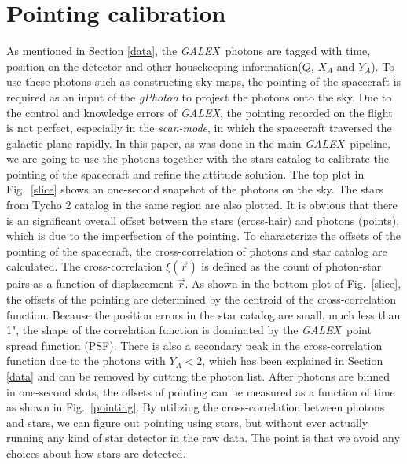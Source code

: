 \documentclass[12pt, preprint]{aastex61}
\newcommand{\project}[1]{\textsl{#1}}
\newcommand{\galex}{\project{GALEX}}
\newcommand{\scanmode}{\project{scan-mode}}
\begin{document}
\section{Pointing calibration}
\label{pc}
As mentioned in Section \ref{data}, the \galex\ photons are tagged with time, position on the detector and other housekeeping information($Q$, $X_A$ and $Y_A$).
To use these photons such as constructing sky-maps, the pointing of the spacecraft is required as an input of the 
\project{gPhoton} to project the photons onto the sky.
Due to the control and knowledge errors of \galex, the pointing recorded on the flight is not perfect, especially in the \scanmode, in which the spacecraft traversed the galactic plane rapidly. 
In this paper, as was done in the main \galex\ pipeline, we are going to use the photons together with the stars catalog to calibrate the pointing of the spacecraft and refine the attitude solution.
The top plot in Fig.~\ref{slice} shows an one-second snapshot of the photons on the sky.
The stars from Tycho 2 catalog \citep{tycho2} in the same region are also plotted. 
It is obvious that there is an significant overall offset between the stars (cross-hair) and photons (points),  which is due to the imperfection of the pointing.
To characterize the offsets of the pointing of the spacecraft, the cross-correlation of photons and star catalog are calculated.
The cross-correlation $\xi(\vec{r})$ is defined as the count of photon-star pairs as a function of displacement $\vec{r}$.
As shown in the bottom plot of Fig.~\ref{slice}, the offsets of the pointing are determined by the centroid of the cross-correlation function.
Because the position errors in the star catalog are small, much less than 1", the shape of the correlation function is dominated by the \galex\ point spread function (PSF).
There is also a secondary peak in the cross-correlation function due to the photons with $Y_A<2$, which has been explained in Section \ref{data} and can be removed by cutting the photon list.
After photons are binned in one-second slots, the offsets of pointing can be measured as a function of time as shown in Fig.~\ref{pointing}.
By utilizing the cross-correlation between photons and stars, we can figure out pointing using stars, but without ever actually running any kind of star detector in the raw data. 
The point is that we avoid any choices about how stars are detected.
\end{document}
